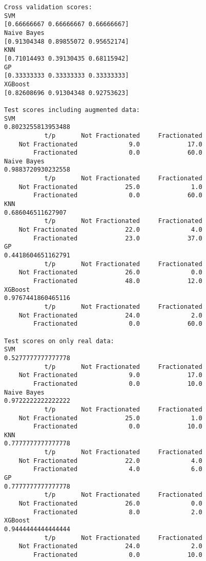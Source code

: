 \documentclass[11pt]{article}
\begin{document}
    \begin{Verbatim}[commandchars=\\\{\}]
Cross validation scores:
SVM
[0.66666667 0.66666667 0.66666667]
Naive Bayes
[0.91304348 0.89855072 0.95652174]
KNN
[0.71014493 0.39130435 0.68115942]
GP
[0.33333333 0.33333333 0.33333333]
XGBoost
[0.82608696 0.91304348 0.92753623]

Test scores including augmented data:
SVM
0.8023255813953488
           t/p       Not Fractionated     Fractionated 
    Not Fractionated              9.0             17.0 
        Fractionated              0.0             60.0 
Naive Bayes
0.9883720930232558
           t/p       Not Fractionated     Fractionated 
    Not Fractionated             25.0              1.0 
        Fractionated              0.0             60.0 
KNN
0.686046511627907
           t/p       Not Fractionated     Fractionated 
    Not Fractionated             22.0              4.0 
        Fractionated             23.0             37.0 
GP
0.4418604651162791
           t/p       Not Fractionated     Fractionated 
    Not Fractionated             26.0              0.0 
        Fractionated             48.0             12.0 
XGBoost
0.9767441860465116
           t/p       Not Fractionated     Fractionated 
    Not Fractionated             24.0              2.0 
        Fractionated              0.0             60.0 

Test scores on only real data:
SVM
0.5277777777777778
           t/p       Not Fractionated     Fractionated 
    Not Fractionated              9.0             17.0 
        Fractionated              0.0             10.0 
Naive Bayes
0.9722222222222222
           t/p       Not Fractionated     Fractionated 
    Not Fractionated             25.0              1.0 
        Fractionated              0.0             10.0 
KNN
0.7777777777777778
           t/p       Not Fractionated     Fractionated 
    Not Fractionated             22.0              4.0 
        Fractionated              4.0              6.0 
GP
0.7777777777777778
           t/p       Not Fractionated     Fractionated 
    Not Fractionated             26.0              0.0 
        Fractionated              8.0              2.0 
XGBoost
0.9444444444444444
           t/p       Not Fractionated     Fractionated 
    Not Fractionated             24.0              2.0 
        Fractionated              0.0             10.0 

    \end{Verbatim}
\end{document}
